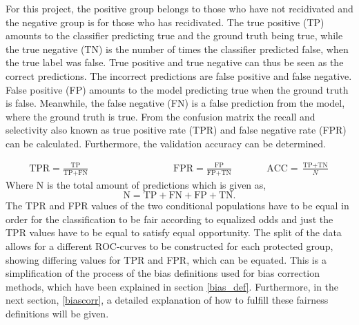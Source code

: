\documentclass[11pt, fleqn, titlepage]{article}
\begin{document}
	\noindent
	For this project, the positive group belongs to those who have not recidivated and the negative group is for those who has recidivated. The true positive (TP) amounts to the classifier predicting true and the ground truth being true, while the true negative (TN) is the number of times the classifier predicted false, when the true label was false. True positive and true negative can thus be seen as the correct predictions. The incorrect predictions are false positive and false negative. False positive (FP) amounts to the model predicting true when the ground truth is false. Meanwhile, the false negative (FN) is a false prediction from the model, where the ground truth is true. From the confusion matrix the recall and selectivity also known as true positive rate (TPR) and false negative rate (FPR) can be calculated. Furthermore, the validation accuracy can be determined.
	
	\begin{align}\label{tpr_fpr_acc}
	\text{TPR} = \frac{\text{TP}}{\text{TP}+\text{FN}}\qquad \qquad \qquad \qquad &
	\text{FPR} = \frac{\text{FP}}{\text{FP}+\text{TN}} \qquad &&
	\text{ACC} = \frac{\text{TP}+\text{TN}}{N}
	\end{align} \noindent
	Where N is the total amount of predictions which is given as, 
	\[\text{N} = \text{TP}+\text{FN}+\text{FP}+\text{TN.}\] 
	The TPR and FPR values of the two conditional populations have to be equal in order for the classification to be fair according to equalized odds and just the TPR values have to be equal to satisfy equal opportunity. The split of the data allows for a different ROC-curves to be constructed for each protected group, showing differing values for TPR and FPR, which can be equated. This is a simplification of the process of the bias definitions used for bias correction methods, which have been explained in section \ref{bias_def}. Furthermore, in the next section, \ref{biascorr}, a detailed explanation of how to fulfill these fairness definitions will be given. 
	
\end{document}
